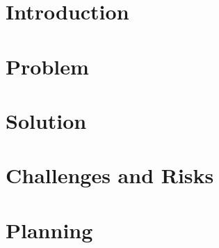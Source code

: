 \documentclass[a4paper,twoside,11pt]{article}
\begin{document}
    

    \section{Introduction}\label{sec:introduction}
    

    \section{Problem}\label{sec:problem}
    

    \section{Solution}\label{sec:solucao}
    

    \section{Challenges and Risks}\label{sec:challenges-risks}
    

    \section{Planning}\label{sec:planning}
    

    
    
\end{document}
